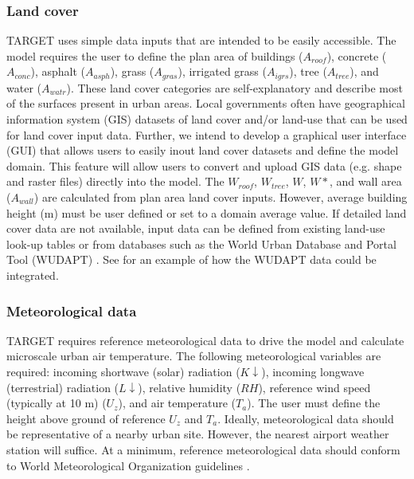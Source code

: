 \documentclass[gmd, manuscript]{copernicus}
\begin{document}
\subsubsection{Land cover}\label{sec:landcover}

TARGET uses simple data inputs that are intended to be easily accessible.  The model requires the user to define the plan area of buildings (\ensuremath{A_{roof}}), concrete (\ensuremath{A_{conc}}), asphalt (\ensuremath{A_{asph}}), grass (\ensuremath{A_{gras}}), irrigated grass (\ensuremath{A_{igrs}}), tree (\ensuremath{A_{tree}}), and water (\ensuremath{A_{watr}}). These land cover categories are self-explanatory and describe most of the surfaces present in urban areas. Local governments often have geographical information system (GIS) datasets of land cover and/or land-use that can be used for land cover input data. Further, we intend to develop a graphical user interface (GUI) that allows users to easily inout land cover datasets and define the model domain. This  feature will allow users to convert and upload GIS data (e.g. shape and raster files) directly into the model. The $W_{roof}$, $W_{tree}$, $W$, $W*$, and wall area (\ensuremath{A_{wall}}) are calculated from plan area land cover inputs. However, average building height (m) must be user defined or set to a domain average value. If detailed land cover data are not available, input data can be defined from existing land-use look-up tables or from databases such as the World Urban Database and Portal Tool (WUDAPT) \citep{mills2015,Ching2018}. See \cite{wouters2016efficient} for an example of how the WUDAPT data could be integrated. 


\subsubsection{Meteorological data}\label{sec:metdata}

TARGET requires reference meteorological data to drive the model and calculate microscale urban air temperature. The following meteorological variables are required: incoming shortwave (solar) radiation (\ensuremath{K\downarrow}), incoming longwave (terrestrial) radiation (\ensuremath{L\downarrow}), relative humidity (\ensuremath{RH}), reference wind speed (typically at 10 m) (\ensuremath{U_{z}}), and air temperature (\ensuremath{T_{a}}). The user must define the height above ground of reference \ensuremath{U_{z}} and \ensuremath{T_{a}}. Ideally, meteorological data should be representative of a nearby urban site. However, the nearest airport weather station will suffice. %
At a minimum, reference meteorological data should conform to World Meteorological Organization guidelines \citep{oke2007siting}.
\end{document}
